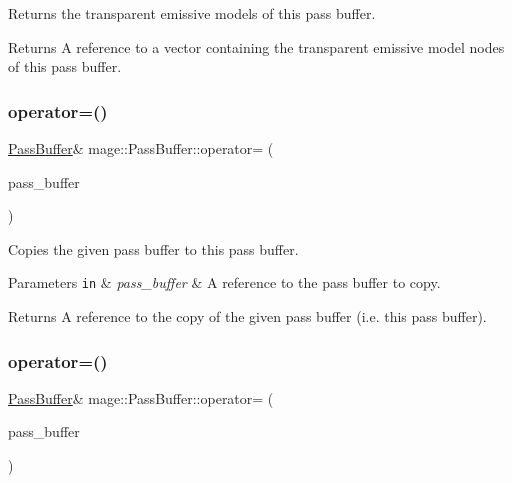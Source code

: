 Returns the transparent emissive models of this pass buffer.

\begin{DoxyReturn}{Returns}
A reference to a vector containing the transparent emissive model nodes of this pass buffer. 
\end{DoxyReturn}
\hypertarget{structmage_1_1_pass_buffer_a8d0cc48dea7dfb6b710b6162b3a82b7e}{}\label{structmage_1_1_pass_buffer_a8d0cc48dea7dfb6b710b6162b3a82b7e} 
\subsubsection{\texorpdfstring{operator=()}{operator=()}\hspace{0.1cm}{\footnotesize\ttfamily [1/2]}}
{\footnotesize\ttfamily \hyperlink{structmage_1_1_pass_buffer}{Pass\+Buffer}\& mage\+::\+Pass\+Buffer\+::operator= (\begin{DoxyParamCaption}\item[{const \hyperlink{structmage_1_1_pass_buffer}{Pass\+Buffer} \&}]{pass\+\_\+buffer }\end{DoxyParamCaption})\hspace{0.3cm}{\ttfamily [delete]}}

Copies the given pass buffer to this pass buffer.


\begin{DoxyParams}[1]{Parameters}
\mbox{\tt in}  & {\em pass\+\_\+buffer} & A reference to the pass buffer to copy. \\
\hline
\end{DoxyParams}
\begin{DoxyReturn}{Returns}
A reference to the copy of the given pass buffer (i.\+e. this pass buffer). 
\end{DoxyReturn}
\hypertarget{structmage_1_1_pass_buffer_a8a5832066c415bea077107c7a9d18df5}{}\label{structmage_1_1_pass_buffer_a8a5832066c415bea077107c7a9d18df5} 
\subsubsection{\texorpdfstring{operator=()}{operator=()}\hspace{0.1cm}{\footnotesize\ttfamily [2/2]}}
{\footnotesize\ttfamily \hyperlink{structmage_1_1_pass_buffer}{Pass\+Buffer}\& mage\+::\+Pass\+Buffer\+::operator= (\begin{DoxyParamCaption}\item[{\hyperlink{structmage_1_1_pass_buffer}{Pass\+Buffer} \&\&}]{pass\+\_\+buffer }\end{DoxyParamCaption})\hspace{0.3cm}{\ttfamily [delete]}}

